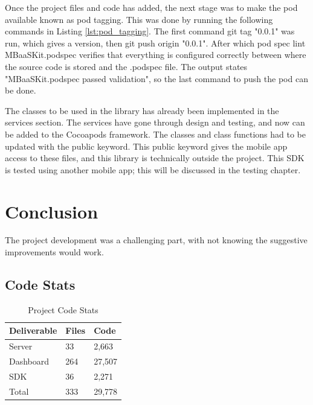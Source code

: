 Once the project files and code has added, the next stage was to make the pod available known as pod tagging. This was done by running the following commands in Listing \ref{lst:pod_tagging}. The first command git tag "0.0.1" was run, which gives a version, then git push origin "0.0.1". After which pod spec lint MBaaSKit.podspec verifies that everything is configured correctly between where the source code is stored and the .podspec file. The output states "MBaaSKit.podspec passed validation", so the last command to push the pod can be done. 



The classes to be used in the library has already been implemented in the services section. The services have gone through design and testing, and now can be added to the Cocoapods framework. The classes and class functions had to be updated with the public keyword. This public keyword gives the mobile app access to these files, and this library is technically outside the project. This SDK is tested using another mobile app; this will be discussed in the testing chapter.

\section{Conclusion}

The project development was a challenging part, with not knowing the suggestive improvements would work.

\subsection{Code Stats}

\begin{table}[!h]
\centering
\caption{Project Code Stats}
\label{my-label}
\begin{tabular}{|l|l|l|}
\hline
\rowcolor{green!20}
Deliverable & Files & Code   \\ \hline
Server      & 33    & 2,663  \\ \hline
Dashboard   & 264   & 27,507 \\ \hline
SDK         & 36    & 2,271  \\ \hline
Total       & 333   & 29,778 \\ \hline
\end{tabular}
\end{table}